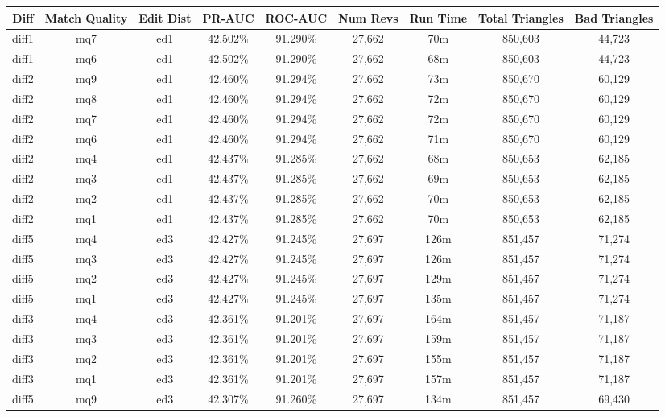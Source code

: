 \begin{sidewaystable}[!ph]
  \begin{center}
    \begin{tabular}{|c|c|c||c|c||c|c|c|c|}
\hline
Diff & Match Quality & Edit Dist
        & PR-AUC & ROC-AUC
        & Num Revs & Run Time
        & Total Triangles & Bad Triangles \\
\hline
\hline
diff1 & mq7 & ed1 & 42.502\% & 91.290\% & 27,662 & 70m & 850,603 & 44,723 \\
diff1 & mq6 & ed1 & 42.502\% & 91.290\% & 27,662 & 68m & 850,603 & 44,723 \\
diff2 & mq9 & ed1 & 42.460\% & 91.294\% & 27,662 & 73m & 850,670 & 60,129 \\
diff2 & mq8 & ed1 & 42.460\% & 91.294\% & 27,662 & 72m & 850,670 & 60,129 \\
diff2 & mq7 & ed1 & 42.460\% & 91.294\% & 27,662 & 72m & 850,670 & 60,129 \\
diff2 & mq6 & ed1 & 42.460\% & 91.294\% & 27,662 & 71m & 850,670 & 60,129 \\
diff2 & mq4 & ed1 & 42.437\% & 91.285\% & 27,662 & 68m & 850,653 & 62,185 \\
diff2 & mq3 & ed1 & 42.437\% & 91.285\% & 27,662 & 69m & 850,653 & 62,185 \\
diff2 & mq2 & ed1 & 42.437\% & 91.285\% & 27,662 & 70m & 850,653 & 62,185 \\
diff2 & mq1 & ed1 & 42.437\% & 91.285\% & 27,662 & 70m & 850,653 & 62,185 \\
diff5 & mq4 & ed3 & 42.427\% & 91.245\% & 27,697 & 126m & 851,457 & 71,274 \\
diff5 & mq3 & ed3 & 42.427\% & 91.245\% & 27,697 & 126m & 851,457 & 71,274 \\
diff5 & mq2 & ed3 & 42.427\% & 91.245\% & 27,697 & 129m & 851,457 & 71,274 \\
diff5 & mq1 & ed3 & 42.427\% & 91.245\% & 27,697 & 135m & 851,457 & 71,274 \\
diff3 & mq4 & ed3 & 42.361\% & 91.201\% & 27,697 & 164m & 851,457 & 71,187 \\
diff3 & mq3 & ed3 & 42.361\% & 91.201\% & 27,697 & 159m & 851,457 & 71,187 \\
diff3 & mq2 & ed3 & 42.361\% & 91.201\% & 27,697 & 155m & 851,457 & 71,187 \\
diff3 & mq1 & ed3 & 42.361\% & 91.201\% & 27,697 & 157m & 851,457 & 71,187 \\
diff5 & mq9 & ed3 & 42.307\% & 91.260\% & 27,697 & 134m & 851,457 & 69,430 \\

\end{tabular}
\end{center}
\end{sidewaystable}
